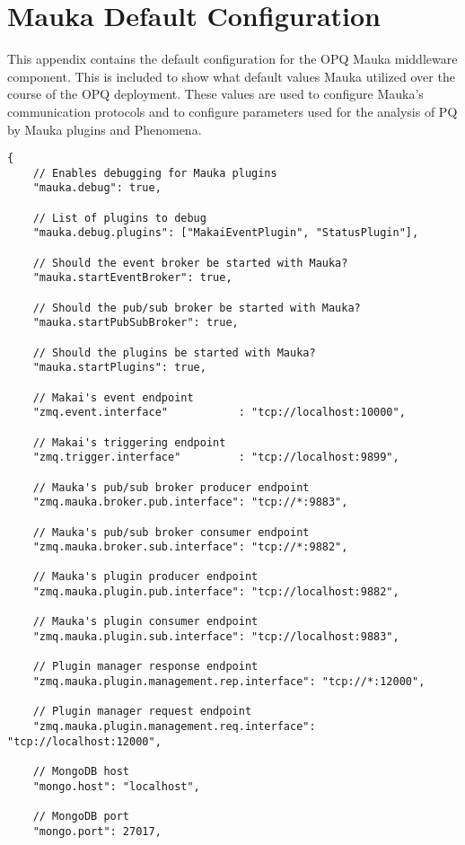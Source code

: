 \appendixpage

\chapter{Mauka Default Configuration}\label{appendix:MaukaConfig}

This appendix contains the default configuration for the OPQ Mauka middleware component. This is included to show what default values Mauka utilized over the course of the OPQ deployment. These values are used to configure Mauka's communication protocols and to configure parameters used for the analysis of PQ by Mauka plugins and Phenomena.

\begin{lstlisting}
{
	// Enables debugging for Mauka plugins
	"mauka.debug": true,

	// List of plugins to debug
	"mauka.debug.plugins": ["MakaiEventPlugin", "StatusPlugin"],

	// Should the event broker be started with Mauka?
	"mauka.startEventBroker": true,

	// Should the pub/sub broker be started with Mauka?
	"mauka.startPubSubBroker": true,

	// Should the plugins be started with Mauka?
	"mauka.startPlugins": true,

	// Makai's event endpoint
	"zmq.event.interface"           : "tcp://localhost:10000",

	// Makai's triggering endpoint
	"zmq.trigger.interface"         : "tcp://localhost:9899",

	// Mauka's pub/sub broker producer endpoint
	"zmq.mauka.broker.pub.interface": "tcp://*:9883",

	// Mauka's pub/sub broker consumer endpoint
	"zmq.mauka.broker.sub.interface": "tcp://*:9882",

	// Mauka's plugin producer endpoint
	"zmq.mauka.plugin.pub.interface": "tcp://localhost:9882",

	// Mauka's plugin consumer endpoint
	"zmq.mauka.plugin.sub.interface": "tcp://localhost:9883",

	// Plugin manager response endpoint
	"zmq.mauka.plugin.management.rep.interface": "tcp://*:12000",

	// Plugin manager request endpoint
	"zmq.mauka.plugin.management.req.interface": "tcp://localhost:12000",

	// MongoDB host
	"mongo.host": "localhost",

	// MongoDB port
	"mongo.port": 27017,


\end{lstlisting}
